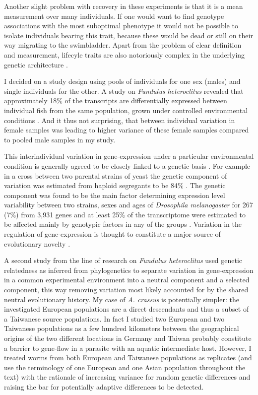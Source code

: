 Another slight problem with recovery in these experiments is that it
is a mean measurement over many individuals. If one would want to find
genotype associations with the most suboptimal phenotype it would not
be possible to isolate individuals bearing this trait, because these
would be dead or still on their way migrating to the
swimbladder. Apart from the problem of clear definition and
measurement, lifecyle traits are also notoriously complex in the
underlying genetic architecture \cite{pmid18454194}.

I decided on a study design using pools of individuals for one sex
(males) and single individuals for the other. A study on
\textit{Fundulus heteroclitus} revealed that approximately 18\% of the
transcripts are differentially expressed between individual fish from
the same population, grown under controlled environmental conditions
\cite{pmid12219088}. And it thus not surprising, that between
individual variation in female samples was leading to higher variance
of these female samples compared to pooled male samples in my study.

This interindividual variation in gene-expression under a particular
environmental condition is generally agreed to be closely linked to a
genetic basis \cite{pmid15498452}. For example in a cross between two
parental strains of yeast the genetic component of variation was
estimated from haploid segregants to be 84\% \cite{pmid11923494}. The
genetic component was found to be the main factor determining
expression level variability between two strains, sexes and ages of
\textit{Drosophila melanogaster} for 267 (7\%) from 3,931 genes and at
least 25\% of the transcriptome were estimated to be affected mainly
by genotypic factors in any of the groups
\cite{pmid11726925}. Variation in the regulation of gene-expression is
thought to constitute a major source of evolutionary novelty
\cite{pmid11341673}.

A second study from the line of research on \textit{Fundulus
  heteroclitus} \cite{pmid16567645} used genetic relatedness as
inferred from phylogenetics to separate variation in gene-expression
in a common experimental environment into a neutral component and a
selected component, this way removing variation most likely accounted
for by the shared neutral evolutionary history. My case of
\textit{A. crassus} is potentially simpler: the investigated European
populations are a direct descendants and thus a subset of a Taiwanese
source populations. In fact I studied two European and two Taiwanese
populations as a few hundred kilometers between the geographical
origins of the two different locations in Germany and Taiwan probably
constitute a barrier to gene-flow in a parasite with an aquatic
intermediate host. However, I treated worms from both European and
Taiwanese populations as replicates (and use the terminology of one
European and one Asian population throughout the text) with the
rationale of increasing variance for random genetic differences and
raising the bar for potentially adaptive differences to be detected.

